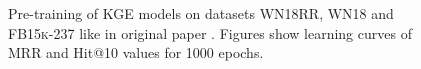 \begin{figure}
\begin{minipage}{.3\textwidth}
    \end{minipage}%
    \caption{Pre-training of \ac{KGE} models on datasets \textsc{WN18RR}, \textsc{WN18} and \textsc{FB15k-237} like in original \kbgan paper \cite{cai2017kbgan}.
    Figures show learning curves of MRR and Hit@10 values for 1000 epochs.}
    \label{fig:pretraining}
\end{figure}


